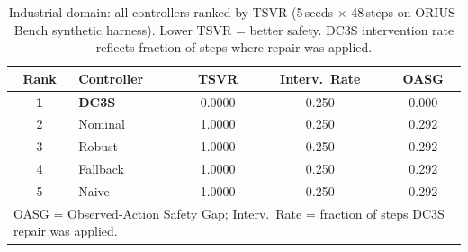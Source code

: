 \begin{table}[htbp]
\centering\small
\caption{Industrial domain: all controllers ranked by TSVR (5\,seeds $\times$ 48\,steps on ORIUS-Bench synthetic harness). Lower TSVR = better safety. DC3S intervention rate reflects fraction of steps where repair was applied.}
\label{tab:industrial_leaderboard}
\begin{tabular}{clccc}
\toprule
\textbf{Rank} & \textbf{Controller} & \textbf{TSVR} & \textbf{Interv.\ Rate} & \textbf{OASG} \\
\midrule
\textbf{1} & \textbf{DC3S} & 0.0000 & 0.250 & 0.000 \\
2 & Nominal & 1.0000 & 0.250 & 0.292 \\
3 & Robust & 1.0000 & 0.250 & 0.292 \\
4 & Fallback & 1.0000 & 0.250 & 0.292 \\
5 & Naive & 1.0000 & 0.250 & 0.292 \\
\bottomrule
\multicolumn{5}{l}{\small OASG = Observed-Action Safety Gap; Interv.\ Rate = fraction of steps DC3S repair was applied.}\\
\end{tabular}
\end{table}